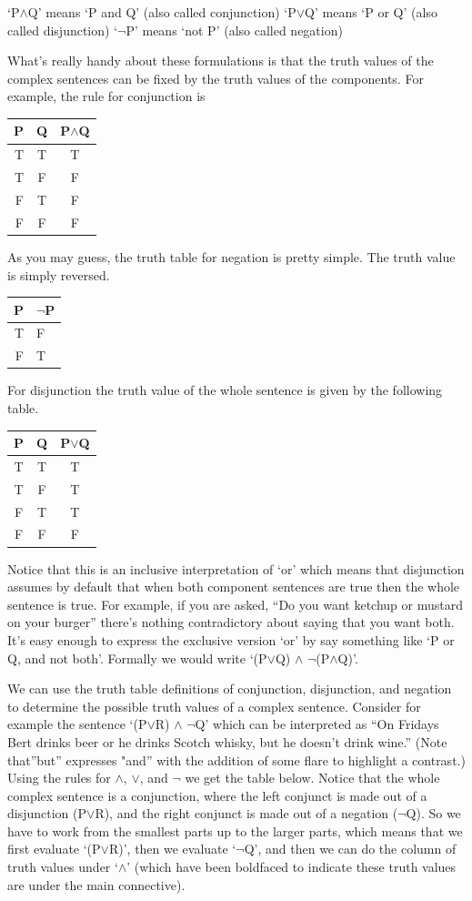 \documentclass[]{tufte-book}
\begin{document}
`P\(\wedge\)Q' means `P and Q' (also called conjunction)
`P\(\vee\)Q' means `P or Q' (also called disjunction)
`\(\neg\)P' means `not P' (also called negation)

What's really handy about these formulations is that the truth values of the complex sentences can be fixed by the truth values of the components. For example, the rule for conjunction is

\begin{longtable}[]{@{}rcc@{}}
\toprule
P & Q & P\(\wedge\)Q\tabularnewline
\midrule
\endhead
T & T & T\tabularnewline
T & F & F\tabularnewline
F & T & F\tabularnewline
F & F & F\tabularnewline
\bottomrule
\end{longtable}

As you may guess, the truth table for negation is pretty simple. The truth value is simply reversed.

\begin{longtable}[]{@{}rl@{}}
\toprule
P & \(\neg\)P\tabularnewline
\midrule
\endhead
T & F\tabularnewline
F & T\tabularnewline
\bottomrule
\end{longtable}

For disjunction the truth value of the whole sentence is given by the following table.

\begin{longtable}[]{@{}ccc@{}}
\toprule
P & Q & P\(\vee\)Q\tabularnewline
\midrule
\endhead
T & T & T\tabularnewline
T & F & T\tabularnewline
F & T & T\tabularnewline
F & F & F\tabularnewline
\bottomrule
\end{longtable}

Notice that this is an inclusive interpretation of `or' which means that disjunction assumes by default that when both component sentences are true then the whole sentence is true. For example, if you are asked, ``Do you want ketchup or mustard on your burger'' there's nothing contradictory about saying that you want both. It's easy enough to express the exclusive version `or' by say something like `P or Q, and not both'. Formally we would write `(P\(\vee\)Q) \(\wedge\) \(\neg\)(P\(\wedge\)Q)'.

We can use the truth table definitions of conjunction, disjunction, and negation to determine the possible truth values of a complex sentence. Consider for example the sentence `(P\(\vee\)R) \(\wedge\) \(\neg\)Q' which can be interpreted as ``On Fridays Bert drinks beer or he drinks Scotch whisky, but he doesn't drink wine.'' (Note that''but'' expresses "and'' with the addition of some flare to highlight a contrast.) Using the rules for \(\wedge\), \(\vee\), and \(\neg\) we get the table below. Notice that the whole complex sentence is a conjunction, where the left conjunct is made out of a disjunction (P\(\vee\)R), and the right conjunct is made out of a negation (\(\neg\)Q). So we have to work from the smallest parts up to the larger parts, which means that we first evaluate `(P\(\vee\)R)', then we evaluate `\(\neg\)Q', and then we can do the column of truth values under `\(\wedge\)' (which have been boldfaced to indicate these truth values are under the main connective).
\end{document}
